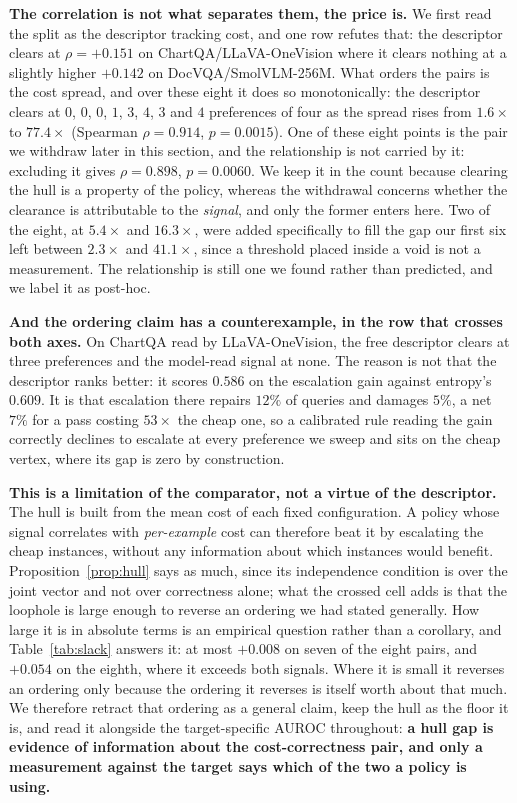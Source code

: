 \documentclass[10pt,twocolumn]{article}
\theoremstyle{plain}
\begin{document}
\textbf{The correlation is not what separates them, the price is.} We first
read the split as the descriptor tracking cost, and one row refutes that: the
descriptor clears at $\rho = +0.151$ on ChartQA/LLaVA-OneVision where it clears
nothing at a slightly higher $+0.142$ on DocVQA/SmolVLM-256M. What orders the
pairs is the cost spread, and over these eight it does so monotonically: the
descriptor clears at $0$, $0$, $0$, $1$, $3$, $4$, $3$ and $4$ preferences of
four as the spread rises from $1.6\times$ to $77.4\times$ (Spearman $\rho =
0.914$, $p = 0.0015$). One of these eight points is the pair we withdraw later
in this section, and the relationship is not carried by it: excluding it gives
$\rho = 0.898$, $p = 0.0060$. We keep it in the count because clearing the hull
is a property of the policy, whereas the withdrawal concerns whether the
clearance is attributable to the \emph{signal}, and only the former enters
here. Two of the eight, at $5.4\times$ and $16.3\times$, were
added specifically to fill the gap our first six left between $2.3\times$ and
$41.1\times$, since a threshold placed inside a void is not a measurement. The
relationship is still one we found rather than predicted, and we label it as
post-hoc.

\textbf{And the ordering claim has a counterexample, in the row that crosses
both axes.} On ChartQA read by LLaVA-OneVision, the free descriptor clears at
three preferences and the model-read signal at none. The reason is not that the
descriptor ranks better: it scores $0.586$ on the escalation gain against
entropy's $0.609$. It is that escalation there repairs $12\%$ of queries and
damages $5\%$, a net $7\%$ for a pass costing $53\times$ the cheap one, so a
calibrated rule reading the gain correctly declines to escalate at every
preference we sweep and sits on the cheap vertex, where its gap is zero by
construction.

\textbf{This is a limitation of the comparator, not a virtue of the
descriptor.} The hull is built from the mean cost of each fixed configuration.
A policy whose signal correlates with \emph{per-example} cost can therefore
beat it by escalating the cheap instances, without any information about which
instances would benefit. Proposition~\ref{prop:hull} says as much, since its independence
condition is over the joint vector and not over correctness alone; what the
crossed cell adds is that the loophole is large enough to reverse an ordering
we had stated generally. How large it is in absolute terms is an empirical
question rather than a corollary, and Table~\ref{tab:slack} answers it: at most
$+0.008$ on seven of the eight pairs, and $+0.054$ on the eighth, where it
exceeds both signals. Where it is small it reverses an ordering only because
the ordering it reverses is itself worth about that much. We
therefore retract that ordering as a general claim, keep the hull as the floor
it is, and read it alongside the target-specific AUROC throughout: \textbf{a
hull gap is evidence of information about the cost-correctness pair, and only a
measurement against the target says which of the two a policy is using.}
\end{document}
